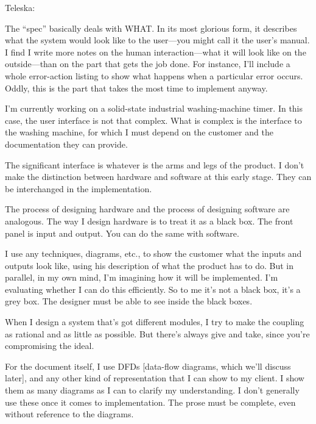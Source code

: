 \begin{interview}
Teleska:

\begin{tfquot}
The ``spec'' basically deals with WHAT. In its most glorious form, it
describes what the system would look like to the user---you might call it the
user's manual. I find I write more notes on the human interaction---what it
will look like on the outside---than on the part that gets the job
done. For instance, I'll include a whole error-action listing to show
what happens when a particular error occurs. Oddly, this is the part
that takes the most time to implement anyway.

I'm currently working on a solid-state industrial washing-machine
timer. In this case, the user interface is not that complex. What is
complex is the interface to the washing machine, for which I must
depend on the customer and the documentation they can provide.

The significant interface is whatever is the arms and legs of the
product. I don't make the distinction between hardware and software at
this early stage. They can be interchanged in the implementation.

The process of designing hardware and the process of designing
software are analogous. The way I design hardware is to treat it as a
black box. The front panel is input and output. You can do the same
with software.

I use any techniques, diagrams, etc., to show the customer what the
inputs and outputs look like, using his description of what the
product has to do.  But in parallel, in my own mind, I'm imagining how
it will be implemented.  I'm evaluating whether I can do this
efficiently. So to me it's not a black box, it's a grey box. The
designer must be able to see inside the black boxes.

When I design a system that's got different modules, I try to make the
coupling as rational and as little as possible. But there's always
give and take, since you're compromising the ideal.

For the document itself, I use DFDs {[}data-flow diagrams, which we'll
discuss later{]}, and any other kind of representation that I can show
to my client. I show them as many diagrams as I can to clarify my
understanding.  I don't generally use these once it comes to
implementation. The prose must be complete, even without reference to
the diagrams.
\end{tfquot}
\end{interview}

